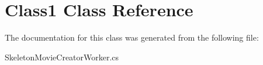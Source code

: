 \hypertarget{class_class1}{}\section{Class1 Class Reference}
\label{class_class1}


The documentation for this class was generated from the following file\+:\begin{DoxyCompactItemize}
\item 
Skeleton\+Movie\+Creator\+Worker.\+cs\end{DoxyCompactItemize}
